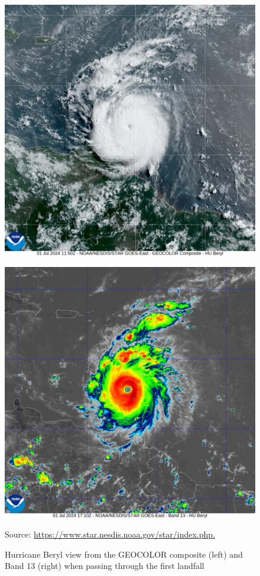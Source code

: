 \begin{figure}[h!]
	\centering
	\caption{Hurricane Beryl view from the GEOCOLOR composite (left) and Band 13 (right) when passing through the first landfall}
	
	\begin{minipage}{.48\textwidth}
		\centering
		\includegraphics[width=\linewidth]{docs/figuras/chapter5/20241831150_GOES16-ABI-FL-GEOCOLOR-AL022024-2000x2000.jpg}
		\label{}
	\end{minipage}%
	\hfill
	\begin{minipage}{.48\textwidth}
		\centering
		\includegraphics[width=\linewidth]{docs/figuras/chapter5/20241831710_GOES16-ABI-FL-13-AL022024-2000x2000.jpg}
		\label{fig:HurricaneBerylBand13}
	\end{minipage}
Source: \url{https://www.star.nesdis.noaa.gov/star/index.php.}
\end{figure}

